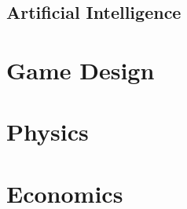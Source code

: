 \documentclass{article}
\begin{document}
\subsection{Artificial Intelligence}


\newpage
\section{Game Design}

\newpage
\section{Physics}

\newpage
\section{Economics}


\newpage
\theendnotes
\end{document}
